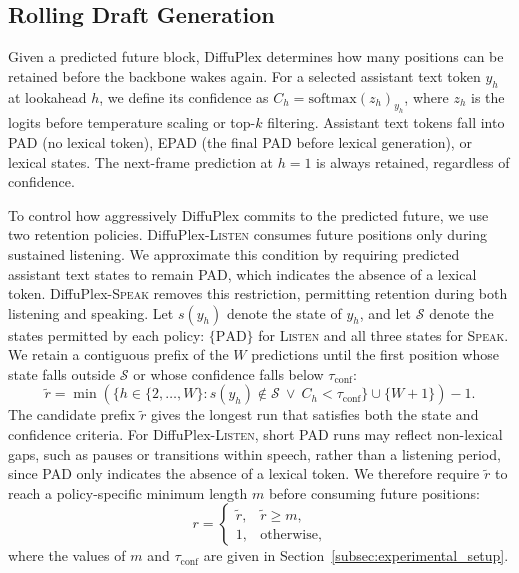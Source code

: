 \subsection{Rolling Draft Generation}
\label{subsec:rolling_draft_generation}

Given a predicted future block, DiffuPlex determines how many positions can be retained before the backbone wakes again.
For a selected assistant text token $y_h$ at lookahead $h$, we define its confidence as
$C_h=\mathrm{softmax}(z_h)_{y_h}$,
where $z_h$ is the logits before temperature scaling or top-$k$ filtering.
Assistant text tokens fall into PAD (no lexical token), EPAD (the final PAD before lexical generation), or lexical states.
The next-frame prediction at $h=1$ is always retained, regardless of confidence.

To control how aggressively DiffuPlex commits to the predicted future, we use two retention policies.
DiffuPlex-\textsc{Listen} consumes future positions only during sustained listening.
We approximate this condition by requiring predicted assistant text states to remain PAD, which indicates the absence of a lexical token.
DiffuPlex-\textsc{Speak} removes this restriction, permitting retention during both listening and speaking.
Let $s(y_h)$ denote the state of $y_h$, and let $\mathcal{S}$ denote the states permitted by each policy: $\{\mathrm{PAD}\}$ for \textsc{Listen} and all three states for \textsc{Speak}.
We retain a contiguous prefix of the $W$ predictions until the first position whose state falls outside $\mathcal{S}$ or whose confidence falls below $\tau_{\mathrm{conf}}$:
\begin{equation}
\tilde r =
\min\left(
\{h\in\{2,\ldots,W\}: s(y_h)\notin\mathcal{S}\ \lor\ C_h<\tau_{\mathrm{conf}}\}
\cup \{W+1\}
\right)-1.
\label{eq:retained_prefix}
\end{equation}
The candidate prefix $\tilde r$ gives the longest run that satisfies both the state and confidence criteria.
For DiffuPlex-\textsc{Listen}, short PAD runs may reflect non-lexical gaps, such as pauses or transitions within speech, rather than a listening period, since PAD only indicates the absence of a lexical token.
We therefore require $\tilde r$ to reach a policy-specific minimum length $m$ before consuming future positions:
\begin{equation}
r=
\begin{cases}
\tilde r, & \tilde r\ge m,\\
1, & \text{otherwise},
\end{cases}
\label{eq:min_retained}
\end{equation}
where the values of $m$ and $\tau_{\mathrm{conf}}$ are given in Section~\ref{subsec:experimental_setup}.

